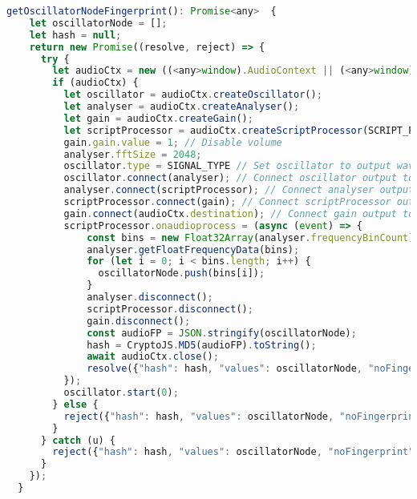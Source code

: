 \begin{lstlisting}[language=JavaScript, caption=OscillatorNode fingerprint generation code, label=oscillatorNodeFingerprintGenerationCode]
  getOscillatorNodeFingerprint(): Promise<any>  {
    let oscillatorNode = [];
    let hash = null;
    return new Promise((resolve, reject) => {
      try {
        let audioCtx = new ((<any>window).AudioContext || (<any>window).webkitAudioContext)();
        if (audioCtx) {
          let oscillator = audioCtx.createOscillator();
          let analyser = audioCtx.createAnalyser();
          let gain = audioCtx.createGain();
          let scriptProcessor = audioCtx.createScriptProcessor(SCRIPT_PROCESSOR.bufferSize, SCRIPT_PROCESSOR.numberOfInputChannels, SCRIPT_PROCESSOR.numberOfOutputChannels);
          gain.gain.value = 1; // Disable volume
          analyser.fftSize = 2048;
          oscillator.type = SIGNAL_TYPE // Set oscillator to output wave
          oscillator.connect(analyser); // Connect oscillator output to analyser input
          analyser.connect(scriptProcessor); // Connect analyser output to scriptProcessor input
          scriptProcessor.connect(gain); // Connect scriptProcessor output to gain input
          gain.connect(audioCtx.destination); // Connect gain output to audiocontext destination
          scriptProcessor.onaudioprocess = (async (event) => {
              const bins = new Float32Array(analyser.frequencyBinCount);
              analyser.getFloatFrequencyData(bins);
              for (let i = 0; i < bins.length; i++) {
                oscillatorNode.push(bins[i]);
              }
              analyser.disconnect();
              scriptProcessor.disconnect();
              gain.disconnect();
              const audioFP = JSON.stringify(oscillatorNode);
              hash = CryptoJS.MD5(audioFP).toString();
              await audioCtx.close();
              resolve({"hash": hash, "values": oscillatorNode, "noFingerprint": false});
          });
          oscillator.start(0);
        } else {
          reject({"hash": hash, "values": oscillatorNode, "noFingerprint": true});
        }
      } catch (u) {
        reject({"hash": hash, "values": oscillatorNode, "noFingerprint": true});
      }
    });
  }
\end{lstlisting}

